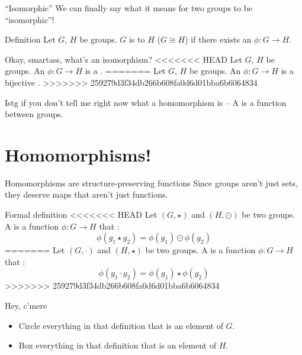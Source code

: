 \documentclass[8pt, handout]{beamer}
\begin{document}
\begin{frame}{``Isomorphic''}
  We can finally say what it means for two groups to be ``isomorphic''! \pause
  \begin{block}{Definition}
    Let $G$, $H$ be groups. $G$ is  to $H$ ($G\cong H$) if there exists an  $\phi: G\to H$.
  \end{block} \pause 

  \begin{block}{Okay, smartass, what's an isomorphism?} \pause
<<<<<<< HEAD
    Let $G$, $H$ be groups. An  $\phi: G \to H$ is a  .
=======
    Let $G$, $H$ be groups. An  $\phi: G \to H$ is a bijective .
>>>>>>> 259279d3f34db266b608fa0d6d01bba6b6064834
  \end{block} \pause

  \begin{exampleblock}{Istg if you don't tell me right now what a homomorphism is --} \pause
    A  is a  function between groups.
  \end{exampleblock}
\end{frame}

\section{Homomorphisms!}

\begin{frame}{Homomorphisms are structure-preserving functions}
  Since groups aren't just sets, they deserve maps that aren't just functions. \pause

  \begin{block}{Formal definition}
<<<<<<< HEAD
    Let $(G, \star)$ and $(H, \odot)$ be two groups. A  is a function $\phi: G\to H$ that :
    \[\phi(g_1 \star g_2) = \phi(g_1) \odot \phi(g_2)\]
=======
    Let $(G, \cdot)$ and $(H, \star)$ be two groups. A  is a function $\phi: G\to H$ that :
    \[\phi(g_1 \cdot g_2) = \phi(g_1) \star \phi(g_2)\]
>>>>>>> 259279d3f34db266b608fa0d6d01bba6b6064834
  \end{block} \pause
  \begin{alertblock}{Hey, c'mere} \pause
    \begin{itemize}
      \item Circle everything in that definition that is an element of $G$. \pause
      \item Box everything in that definition that is an element of $H$.
    \end{itemize}
  \end{alertblock}
\end{frame}
\end{document}
